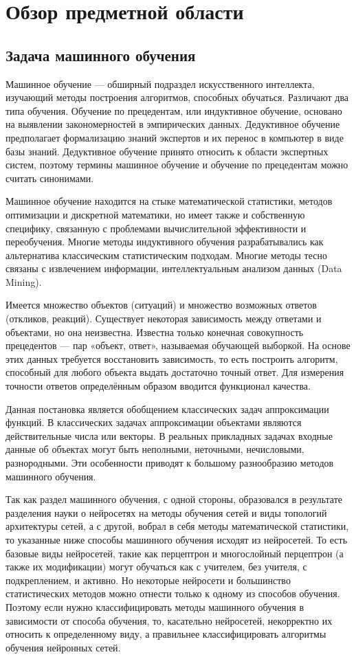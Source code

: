 \section{Обзор предметной области}

\subsection{Задача машинного обучения}

Машинное обучение — обширный подраздел искусственного интеллекта, изучающий методы построения алгоритмов, способных обучаться. Различают два типа обучения. Обучение по прецедентам, или индуктивное обучение, основано на выявлении закономерностей в эмпирических данных. Дедуктивное обучение предполагает формализацию знаний экспертов и их перенос в компьютер в виде базы знаний. Дедуктивное обучение принято относить к области экспертных систем, поэтому термины машинное обучение и обучение по прецедентам можно считать синонимами.

Машинное обучение находится на стыке математической статистики, методов оптимизации и дискретной математики, но имеет также и собственную специфику, связанную с проблемами вычислительной эффективности и переобучения. Многие методы индуктивного обучения разрабатывались как альтернатива классическим статистическим подходам. Многие методы тесно связаны с извлечением информации, интеллектуальным анализом данных (Data Mining).

Имеется множество объектов (ситуаций) и множество возможных ответов (откликов, реакций). Существует некоторая зависимость между ответами и объектами, но она неизвестна. Известна только конечная совокупность прецедентов — пар «объект, ответ», называемая обучающей выборкой. На основе этих данных требуется восстановить зависимость, то есть построить алгоритм, способный для любого объекта выдать достаточно точный ответ. Для измерения точности ответов определённым образом вводится функционал качества.

Данная постановка является обобщением классических задач аппроксимации функций. В классических задачах аппроксимации объектами являются действительные числа или векторы. В реальных прикладных задачах входные данные об объектах могут быть неполными, неточными, нечисловыми, разнородными. Эти особенности приводят к большому разнообразию методов машинного обучения.

Так как раздел машинного обучения, с одной стороны, образовался в результате разделения науки о нейросетях на методы обучения сетей и виды топологий архитектуры сетей, а с другой, вобрал в себя методы математической статистики, то указанные ниже способы машинного обучения исходят из нейросетей. То есть базовые виды нейросетей, такие как перцептрон и многослойный перцептрон (а также их модификации) могут обучаться как с учителем, без учителя, с подкреплением, и активно. Но некоторые нейросети и большинство статистических методов можно отнести только к одному из способов обучения. Поэтому если нужно классифицировать методы машинного обучения в зависимости от способа обучения, то, касательно нейросетей, некорректно их относить к определенному виду, а правильнее классифицировать алгоритмы обучения нейронных сетей.

